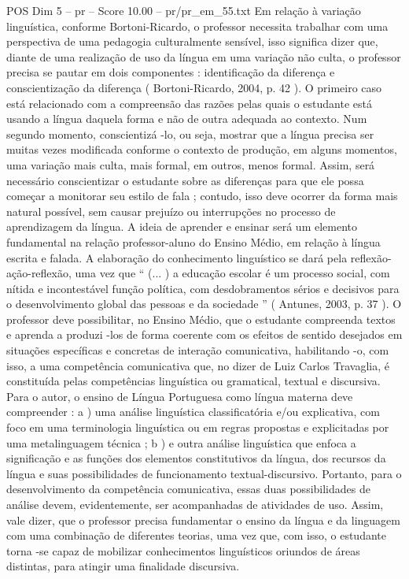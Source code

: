 \begin{textsample}{POS Dim 5 – pr – Score 10.00 – pr/pr\_em\_55.txt}
Em relação à variação linguística, conforme Bortoni-Ricardo, o professor necessita trabalhar com uma perspectiva de uma pedagogia culturalmente sensível, isso significa dizer que, diante de uma realização de uso da língua em uma variação não culta, o professor precisa se pautar em dois componentes : identificação da diferença e conscientização da diferença ( Bortoni-Ricardo, 2004, p. 42 ).
O primeiro caso está relacionado com a compreensão das razões pelas quais o estudante está usando a língua daquela forma e não de outra adequada ao contexto.
Num segundo momento, conscientizá -lo, ou seja, mostrar que a língua precisa ser muitas vezes modificada conforme o contexto de produção, em alguns momentos, uma variação mais culta, mais formal, em outros, menos formal.
Assim, será necessário conscientizar o estudante sobre as diferenças para que ele possa começar a monitorar seu estilo de fala ; contudo, isso deve ocorrer da forma mais natural possível, sem causar prejuízo ou interrupções no processo de aprendizagem da língua.
A ideia de aprender e ensinar será um elemento fundamental na relação professor-aluno do Ensino Médio, em relação à língua escrita e falada.
A elaboração do conhecimento linguístico se dará pela reflexão-ação-reflexão, uma vez que “ (... ) a educação escolar é um processo social, com nítida e incontestável função política, com desdobramentos sérios e decisivos para o desenvolvimento global das pessoas e da sociedade ” ( Antunes, 2003, p. 37 ).
O professor deve possibilitar, no Ensino Médio, que o estudante compreenda textos e aprenda a produzi -los de forma coerente com os efeitos de sentido desejados em situações específicas e concretas de interação comunicativa, habilitando -o, com isso, a uma competência comunicativa que, no dizer de Luiz Carlos Travaglia, é constituída pelas competências linguística ou gramatical, textual e discursiva.
Para o autor, o ensino de Língua Portuguesa como língua materna deve compreender : a ) uma análise linguística classificatória e/ou explicativa, com foco em uma terminologia linguística ou em regras propostas e explicitadas por uma metalinguagem técnica ; b ) e outra análise linguística que enfoca a significação e as funções dos elementos constitutivos da língua, dos recursos da língua e suas possibilidades de funcionamento textual-discursivo.
Portanto, para o desenvolvimento da competência comunicativa, essas duas possibilidades de análise devem, evidentemente, ser acompanhadas de atividades de uso.
Assim, vale dizer, que o professor precisa fundamentar o ensino da língua e da linguagem com uma combinação de diferentes teorias, uma vez que, com isso, o estudante torna -se capaz de mobilizar conhecimentos linguísticos oriundos de áreas distintas, para atingir uma finalidade discursiva.

\end{textsample}
